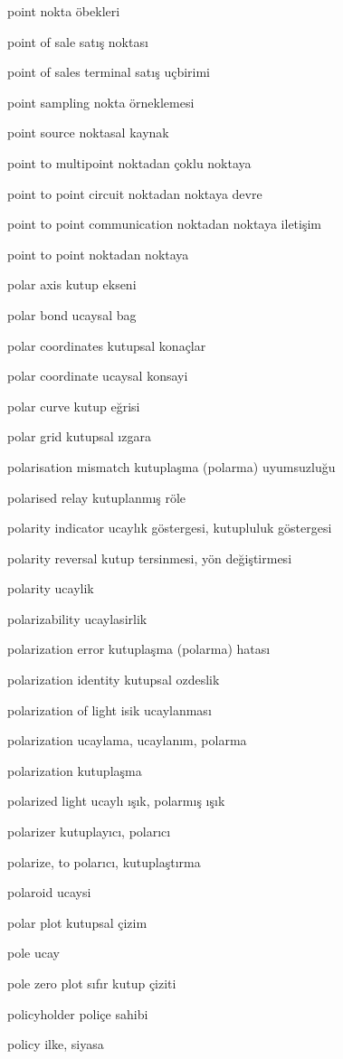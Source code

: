 \documentclass[12pt,fleqn]{article}\usepackage{../../common}
\begin{document}
point nokta öbekleri

point of sale satış noktası

point of sales terminal satış uçbirimi

point sampling nokta örneklemesi

point source noktasal kaynak

point to multipoint noktadan çoklu noktaya

point to point circuit noktadan noktaya devre

point to point communication noktadan noktaya iletişim

point to point noktadan noktaya

polar axis kutup ekseni

polar bond ucaysal bag

polar coordinates kutupsal konaçlar

polar coordinate ucaysal konsayi

polar curve kutup eğrisi

polar grid kutupsal ızgara

polarisation mismatch kutuplaşma (polarma) uyumsuzluğu

polarised relay kutuplanmış röle

polarity indicator ucaylık göstergesi, kutupluluk göstergesi

polarity reversal kutup tersinmesi, yön değiştirmesi

polarity ucaylik

polarizability ucaylasirlik

polarization error kutuplaşma (polarma) hatası

polarization identity kutupsal ozdeslik

polarization of light isik ucaylanması

polarization ucaylama, ucaylanım, polarma

polarization kutuplaşma

polarized light ucaylı ışık, polarmış ışık

polarizer kutuplayıcı, polarıcı

polarize, to polarıcı, kutuplaştırma

polaroid ucaysi

polar plot kutupsal çizim

pole ucay

pole zero plot sıfır kutup çiziti

policyholder poliçe sahibi

policy ilke, siyasa
\end{document}
